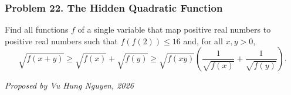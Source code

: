 \subsubsection*{Problem 22. The Hidden Quadratic Function}

\begin{exercisebox}[medium]

Find all functions $f$ of a single variable that map
positive real numbers to positive real numbers such that
$f(f(2))\le 16$ and, for all $x,y>0$,
\[
\sqrt{f(x+y)}
\ge \sqrt{f(x)}+\sqrt{f(y)}
\ge \sqrt{f(xy)}
\left(
\frac{1}{\sqrt{f(x)}}+\frac{1}{\sqrt{f(y)}}
\right).
\]

\begin{flushright}
\textit{Proposed by Vu Hung Nguyen, 2026}
\end{flushright}


\end{exercisebox}